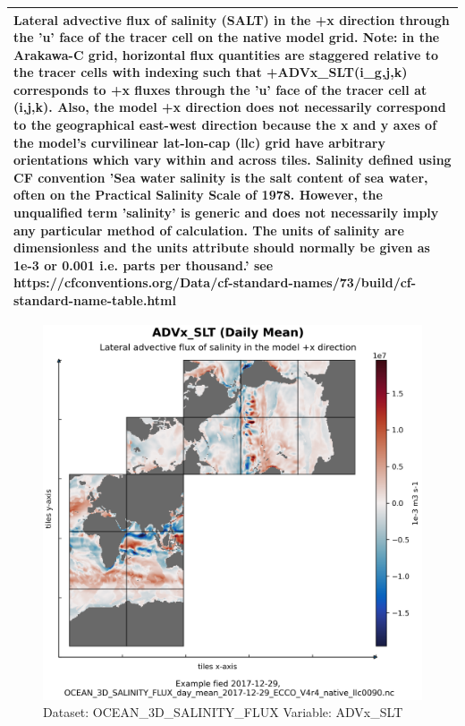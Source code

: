 \begin{longtable}{|m{}|m{}|m{}|m{}|}
\multicolumn{4}{|p{1\textwidth}|}{Lateral advective flux of salinity (SALT) in the +x direction through the 'u' face of the tracer cell on the native model grid. Note: in the Arakawa-C grid, horizontal flux quantities are staggered relative to the tracer cells with indexing such that +ADVx\_SLT(i\_g,j,k) corresponds to +x fluxes through the 'u' face of the tracer cell at (i,j,k). Also, the model +x direction does not necessarily correspond to the geographical east-west direction because the x and y axes of the model's curvilinear lat-lon-cap (llc) grid have arbitrary orientations which vary within and across tiles. Salinity defined using CF convention 'Sea water salinity is the salt content of sea water, often on the Practical Salinity Scale of 1978. However, the unqualified term 'salinity' is generic and does not necessarily imply any particular method of calculation. The units of salinity are dimensionless and the units attribute should normally be given as 1e-3 or 0.001 i.e. parts per thousand.' see https://cfconventions.org/Data/cf-standard-names/73/build/cf-standard-name-table.html} \\ \hline
\end{longtable}

\begin{figure}[H]
\centering
\includegraphics[scale=0.55]{../images/plots/native_plots/Ocean_Three-Dimensional_Salinity_Fluxes/ADVx_SLT.png}
\caption{Dataset: OCEAN\_3D\_SALINITY\_FLUX Variable: ADVx\_SLT}
\label{tab:table-OCEAN_3D_SALINITY_FLUX_ADVx_SLT-Plot}
\end{figure}
\pagebreak
